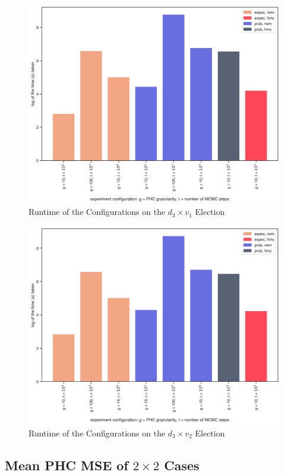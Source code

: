 \begin{figure}[ht]\centering
 \includegraphics[width=0.75\linewidth]{figures/3_1_time.png}
 \caption{Runtime of the Configurations on the $d_3 \times v_1$ Election}
 \label{fig:3_1_time}
\end{figure}

\begin{figure}[ht]\centering
 \includegraphics[width=0.75\linewidth]{figures/3_2_time.png}
 \caption{Runtime of the Configurations on the $d_3 \times v_2$ Election}
 \label{fig:3_2_time}
\end{figure}

\FloatBarrier
\subsection{Mean PHC MSE of $2 \times 2$ Cases}

